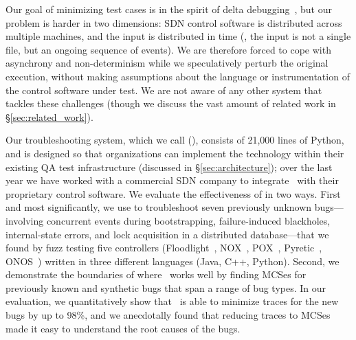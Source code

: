 Our goal of minimizing test cases is in the spirit of
delta debugging~\cite{Zeller:1999:YMP:318773.318946}, but our
problem is harder in two dimensions: SDN control software is distributed
across multiple machines, and the input is distributed in time (\ie, the
input is not a single file, but an ongoing sequence of events).
We are therefore forced to cope with asynchrony and non-determinism while
we speculatively perturb the original execution,
without making assumptions about the language
or instrumentation of the control software under test.
We are not aware of any other system that tackles these
challenges (though we discuss the vast amount of related work in \S\ref{sec:related_work}).

Our troubleshooting system, which we call {\projectname} ({\projectmeaning}),
consists of 21,000 lines of Python, and is designed so that organizations can
implement the technology within their existing QA test infrastructure (discussed in
\S\ref{sec:architecture}); over the last year we have worked with a
commercial SDN company to integrate \projectname~with their proprietary control
software. We evaluate the effectiveness of {\projectname} in
two ways. First and most significantly, we use {\projectname} to troubleshoot
seven previously unknown bugs---involving concurrent events during
bootstrapping, failure-induced blackholes, internal-state errors, and lock acquisition in a distributed database---that we found
by fuzz testing five controllers (Floodlight~\cite{floodlight}, NOX~\cite{nox},
POX~\cite{pox}, Pyretic~\cite{frenetic}, ONOS~\cite{ONOS})
written in three different languages (Java, C++, Python).
Second, we demonstrate the
boundaries of where \projectname~works well by
finding MCSes for previously known and synthetic bugs that span a range of bug
types. In our evaluation, we quantitatively show that \projectname~is able to
minimize traces for the new bugs by up to 98\%, and we anecdotally found that reducing
traces to MCSes made it easy to understand the root causes of the bugs.

